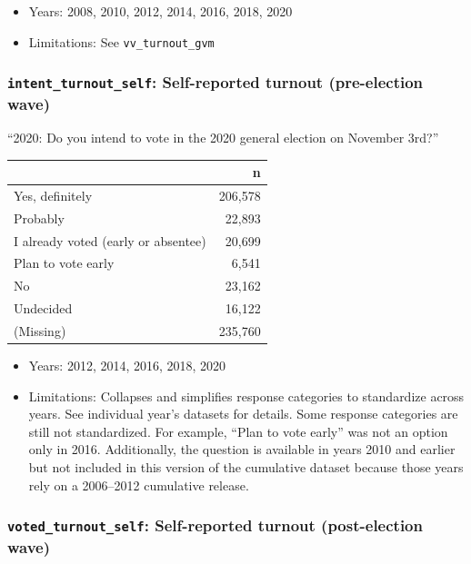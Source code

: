 \documentclass[10pt,article,oneside]{memoir}
\theoremstyle{definition}
\begin{document}
\begin{itemize}
\tightlist
\item
  Years: 2008, 2010, 2012, 2014, 2016, 2018, 2020
\item
  Limitations: See \texttt{vv\_turnout\_gvm}
\end{itemize}

\hypertarget{intent_turnout_self-self-reported-turnout-pre-election-wave}{%
\subsubsection{\texorpdfstring{\texttt{intent\_turnout\_self}:
Self-reported turnout (pre-election
wave)}{intent\_turnout\_self: Self-reported turnout (pre-election wave)}}\label{intent_turnout_self-self-reported-turnout-pre-election-wave}}

``2020: Do you intend to vote in the 2020 general election on November
3rd?''

\begin{table}[H]
\centering
\begin{tabular}[t]{lr}
\toprule
 & n\\
\midrule
Yes, definitely & 206,578\\
Probably & 22,893\\
I already voted (early or absentee) & 20,699\\
Plan to vote early & 6,541\\
No & 23,162\\
Undecided & 16,122\\
(Missing) & 235,760\\
\bottomrule
\end{tabular}
\end{table}

\begin{itemize}
\tightlist
\item
  Years: 2012, 2014, 2016, 2018, 2020
\item
  Limitations: Collapses and simplifies response categories to
  standardize across years. See individual year's datasets for details.
  Some response categories are still not standardized. For example,
  ``Plan to vote early'' was not an option only in 2016. Additionally,
  the question is available in years 2010 and earlier but not included
  in this version of the cumulative dataset because those years rely on
  a 2006--2012 cumulative release.
\end{itemize}

\hypertarget{voted_turnout_self-self-reported-turnout-post-election-wave}{%
\subsubsection{\texorpdfstring{\texttt{voted\_turnout\_self}:
Self-reported turnout (post-election
wave)}{voted\_turnout\_self: Self-reported turnout (post-election wave)}}\label{voted_turnout_self-self-reported-turnout-post-election-wave}}
\end{document}
